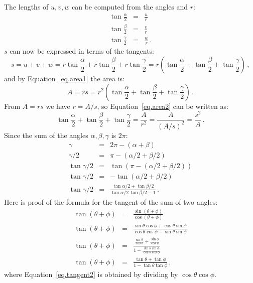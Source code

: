 \vspace*{-4ex}

The lengths of $u,v,w$ can be computed from the angles and $r$:
\begin{eqnarray}
\tan \frac{\alpha}{2} &=& \frac{u}{r}\label{eq.alpha}\\
\tan \frac{\beta}{2} &=& \frac{v}{r}\label{eq.beta}\\
\tan \frac{\gamma}{2} &=& \frac{w}{r}\label{eq.gamma}\,.
\end{eqnarray}
$s$ can now be expressed in terms of the tangents:
\[
s = u+v+w = r\tan \frac{\alpha}{2}+r\tan \frac{\beta}{2}+r\tan \frac{\gamma}{2} = r\left(\tan \frac{\alpha}{2}+\tan \frac{\beta}{2}+\tan \frac{\gamma}{2}\right)\,,
\]
and by Equation~\ref{eq.area1} the area is:
\begin{equation}
A = rs = r^2\left(\tan \frac{\alpha}{2}+\tan \frac{\beta}{2}+\tan \frac{\gamma}{2}\right)\,.\label{eq.area2}
\end{equation}
From $A=rs$ we have $r=A/s$, so Equation~\ref{eq.area2} can be written as:
\begin{equation}
\tan \frac{\alpha}{2}+\tan \frac{\beta}{2}+\tan \frac{\gamma}{2} = \frac{A}{r^2} = \frac{A}{(A/s)^2} = \frac{s^2}{A}\,.\label{eq.area3}
\end{equation}
Since the sum of the angles $\alpha,\beta,\gamma$ is $2\pi$:
\begin{eqnarray}
\gamma &=& 2\pi - (\alpha + \beta)\\
\gamma/2 &=& \pi - (\alpha/2 + \beta/2)\\
\tan\gamma/2 &=& \tan(\pi - (\alpha/2 + \beta/2))\\
\tan\gamma/2 &=& -\tan (\alpha/2 + \beta/2)\\
\tan\gamma/2 &=& \frac{\tan\alpha/2 + \tan\beta/2}{\tan\alpha/2 \, \tan\beta/2-1}\,.\label{eq.tangent1}
\end{eqnarray}
Here is proof of the formula for the tangent of the sum of two angles:
\begin{eqnarray}
\tan (\theta+\phi) &=& \frac{\sin(\theta+\phi)}{\cos(\theta+\phi)}\\
\tan (\theta+\phi) &=&\frac{\sin\theta\cos\phi+\cos\theta\sin\phi}{\cos\theta\cos\phi-\sin\theta\sin\phi}\\
\tan (\theta+\phi) &=&\frac{\displaystyle\frac{\sin\theta}{\cos\theta}+\frac{\sin\phi}{\cos\phi}}{\displaystyle 1-\frac{\sin\theta\sin\phi}{\cos\theta\cos\phi}}\label{eq.tangent2}\\
\tan (\theta+\phi) &=&\frac{\tan\theta + \tan \phi}{1-\tan\theta\tan\phi}\,,\label{eq.tangent3}
\end{eqnarray}
where Equation~\ref{eq.tangent2} is obtained by dividing by $\cos\theta\cos\phi$.

